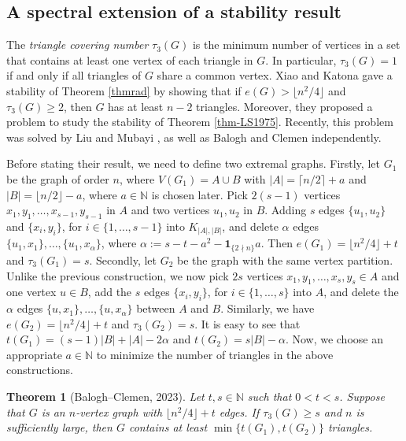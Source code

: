 \documentclass[11pt]{article}
\newtheorem{theorem}{Theorem}[section]
\begin{document}
\subsection{A spectral extension of a stability result}


 The {\it triangle covering number}  $\tau_3(G)$ is the minimum number of vertices in a set that contains at least one vertex of each triangle in $G$. 
In particular,  $\tau_3(G)=1$ if and only if all triangles of $G$ 
share a common vertex. 
Xiao and Katona \cite{XK2021} gave a stability of Theorem \ref{thmrad} by showing  that if $e(G)> \lfloor n^2/4\rfloor$ and $\tau_3(G)\ge 2$, then $G$ has at least 
$n-2$ triangles. 
Moreover, they proposed a problem to study the stability of  Theorem \ref{thm-LS1975}. 
Recently, this problem was solved by Liu and Mubayi 
\cite{LM2022-Erd-Rad}, as well as Balogh and Clemen 
 \cite{BC2023} independently. 


 \medskip 
 Before stating their result, we need to define two extremal graphs. 
 Firstly, 
let $G_1$ be the graph of order $n$, where $V(G_1)=A\cup B$ with $|A| = \lceil {n}/{2}\rceil +a$ and  
$|B| = \lfloor {n}/{2} \rfloor -a$, where $a\in \mathbb{N}$ is chosen later.  
Pick $2(s-1)$ vertices $x_1,y_1,\ldots ,x_{s-1},y_{s-1}$ in $A$ 
and two vertices $u_1,u_2$ in $B$. Adding $s$ edges 
$\{u_1,u_2\}$ and $\{x_i,y_i\}$, for $i\in \{1,\ldots ,s-1\}$  
into $K_{|A|,|B|}$, and  delete  $\alpha$ edges 
$\{u_1,x_1\}, \ldots ,\{u_1,x_{\alpha}\}$, 
where $\alpha := s-t- a^2 - \mathbf{1}_{\{2\nmid n\}} a$.   
Then $e(G_1)=\lfloor n^2/4\rfloor +t$ and $\tau_3(G_1)=s$. 
Secondly, 
let $G_2$ be the graph with the same vertex partition. 
Unlike the previous construction, we now 
pick $2s$ vertices 
$x_1,y_1,\ldots ,x_s,y_s\in A$ and one vertex $u\in B$, 
add the $s$ edges $\{x_i,y_i\}$, for $i\in \{1,\ldots ,s\}$ into $A$, 
and delete the $\alpha$ edges 
$\{u,x_1\},\ldots ,\{u,x_{\alpha}\}$ between $A$ and $B$. 
Similarly, we have $e(G_2)=\lfloor n^2/4\rfloor +t$ and $\tau_3(G_2)=s$. 
It is easy to see that 
$t(G_1)=(s-1)|B| + |A| -2 \alpha$ and 
$t(G_2)=s|B| - \alpha$. 
Now, we choose an appropriate $a\in \mathbb{N}$ 
to minimize the number of triangles in the above constructions.

\begin{theorem}[Balogh--Clemen, 2023]  \label{thm-BC}
Let $t,s\in \mathbb{N}$ such that 
 $0<t<s$. 
Suppose that 
$G$ is an $n$-vertex graph with $\lfloor n^2/4\rfloor +t$ edges.  If  $\tau_3(G) \ge s$ and $n$ is sufficiently large, then $G$ contains at least $\min\{t(G_1),t(G_2)\}$ triangles.
\end{theorem} 
\end{document}
